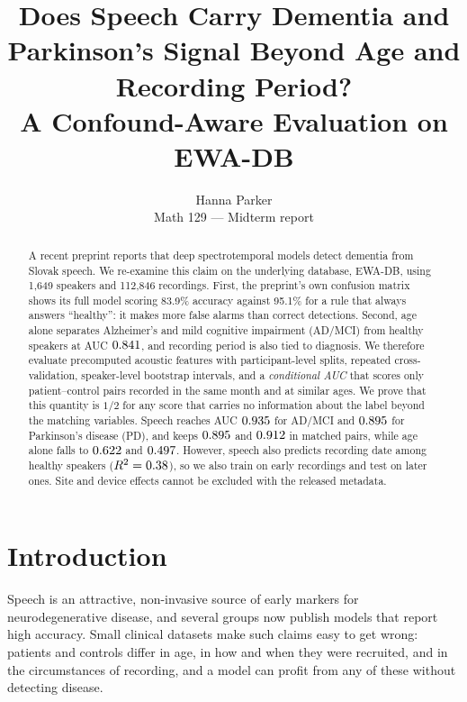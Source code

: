 \documentclass[10pt]{article}
\title{Does Speech Carry Dementia and Parkinson's Signal Beyond Age and Recording Period?\\
A Confound-Aware Evaluation on EWA-DB}
\author{Hanna Parker \And [Partner name]\\
Math 129 --- Midterm report}
\begin{document}
\maketitle

\begin{abstract}
A recent preprint reports that deep spectrotemporal models detect dementia from Slovak speech. We re-examine this claim on the underlying database, EWA-DB, using 1,649 speakers and 112{,}846 recordings. First, the preprint's own confusion matrix shows its full model scoring 83.9\% accuracy against 95.1\% for a rule that always answers ``healthy'': it makes more false alarms than correct detections. Second, age alone separates Alzheimer's and mild cognitive impairment (AD/MCI) from healthy speakers at AUC $0.841$, and recording period is also tied to diagnosis. We therefore evaluate precomputed acoustic features with participant-level splits, repeated cross-validation, speaker-level bootstrap intervals, and a \emph{conditional AUC} that scores only patient--control pairs recorded in the same month and at similar ages. We prove that this quantity is $1/2$ for any score that carries no information about the label beyond the matching variables. Speech reaches AUC $0.935$ for AD/MCI and $0.895$ for Parkinson's disease (PD), and keeps $0.895$ and $0.912$ in matched pairs, while age alone falls to $0.622$ and $0.497$. However, speech also predicts recording date among healthy speakers ($R^2=0.38$), so we also train on early recordings and test on later ones. Site and device effects cannot be excluded with the released metadata.
\end{abstract}

\section{Introduction}
Speech is an attractive, non-invasive source of early markers for neurodegenerative disease, and several groups now publish models that report high accuracy. Small clinical datasets make such claims easy to get wrong: patients and controls differ in age, in how and when they were recruited, and in the circumstances of recording, and a model can profit from any of these without detecting disease.
\end{document}
